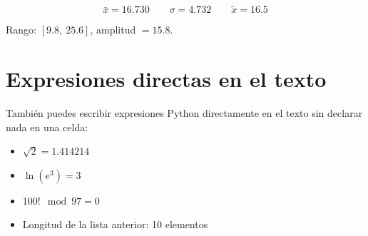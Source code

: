 \documentclass[12pt, a4paper]{article}
\begin{document}
\[
  \bar{x} = 16.730
  \qquad
  \sigma  = 4.732
  \qquad
  \tilde{x} = 16.5
\]

Rango: $[9.8,\ 25.6]$, amplitud $= 15.8$.


\section{Expresiones directas en el texto}

También puedes escribir expresiones Python directamente en el texto
sin declarar nada en una celda:

\begin{itemize}
  \item $\sqrt{2} = 1.414214$
  \item $\ln(e^3) = 3$
  \item $100! \mod 97 = 0$
  \item Longitud de la lista anterior: 10 elementos
\end{itemize}
\end{document}
